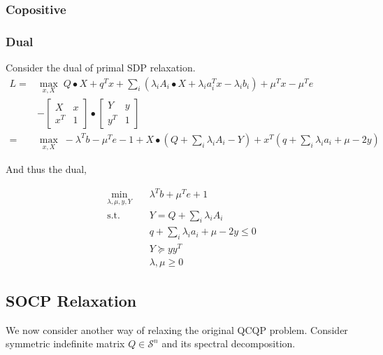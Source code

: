 \documentclass[../main]{subfiles}
\begin{document}
\subsubsection{Copositive}
\subsubsection{Dual}
Consider the dual of primal SDP relaxation.
\begin{equation}
  \begin{aligned}
    L = & \max_{x, X} \; Q\bullet X + q^Tx + \sum_i \left( \lambda_i A_i \bullet X  + \lambda_i a_i^Tx - \lambda_i b_i \right ) + \mu^Tx - \mu^Te \\
        & - \begin{bmatrix}X & x \\ x^T & 1\end{bmatrix} \bullet \begin{bmatrix}Y & y \\ y^T & 1\end{bmatrix}                                                                         \\
    =   & \max_{x, X} \; - \lambda^Tb - \mu^Te - 1+X\bullet (Q + \sum_i\lambda_iA_i - Y) + x^T(q + \sum_i \lambda_i a_i + \mu - 2 y)
  \end{aligned}
\end{equation}

And thus the dual,

\begin{equation}
  \begin{aligned}
    \min_{\lambda, \mu, y, Y}\quad & \lambda^Tb + \mu^Te + 1                    \\
    \mathrm{s.t.} \quad            & Y = Q + \sum_i \lambda_i A_i               \\
                                   & q + \sum_i \lambda_i a_i + \mu - 2 y \le 0 \\
                                   & Y \succeq yy^T                             \\
                                   & \lambda, \mu \ge 0
  \end{aligned}
\end{equation}
\subsection{SOCP Relaxation}

We now consider another way of relaxing the original QCQP problem. Consider symmetric indefinite matrix \(Q \in \mathcal{S}^n\) and its spectral decomposition.
\end{document}
